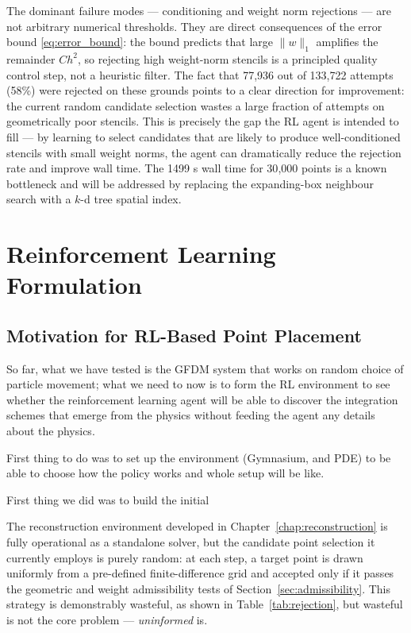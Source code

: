 \documentclass[12pt, a4paper, twoside]{report}
\theoremstyle{plain}
\theoremstyle{definition}
\begin{document}
The dominant failure modes --- conditioning and weight norm rejections
--- are not arbitrary numerical thresholds. They are direct consequences
of the error bound \eqref{eq:error_bound}: the bound predicts that
large $\|w\|_1$ amplifies the remainder $Ch^2$, so rejecting high
weight-norm stencils is a principled quality control step, not a
heuristic filter. The fact that 77{,}936 out of 133{,}722 attempts
(58\%) were rejected on these grounds points to a clear direction for
improvement: the current random candidate selection wastes a large
fraction of attempts on geometrically poor stencils. This is precisely
the gap the RL agent is intended to fill --- by learning to select
candidates that are likely to produce well-conditioned stencils with
small weight norms, the agent can dramatically reduce the rejection
rate and improve wall time. The 1499 s wall time for 30{,}000 points is a known bottleneck and will be addressed by replacing the
expanding-box neighbour search with a $k$-d tree spatial index.\chapter{Reinforcement Learning Formulation}

\section{Motivation for RL-Based Point Placement}


So far, what we have tested is the GFDM system that works on random choice of particle movement; what we need to now is to form the RL environment to see whether the reinforcement learning agent will be able to discover the integration schemes that emerge from the physics without feeding the agent any details about the physics. 

First thing to do was to set up the environment (Gymnasium, and PDE) to be able to choose how the policy works and whole setup will be like.

First thing we did was to build the initial


The reconstruction environment developed in Chapter~\ref{chap:reconstruction} is fully
operational as a standalone solver, but the candidate point selection it currently employs
is purely random: at each step, a target point is drawn uniformly from a pre-defined
finite-difference grid and accepted only if it passes the geometric and weight admissibility
tests of Section~\ref{sec:admissibility}. This strategy is demonstrably wasteful, as shown
in Table~\ref{tab:rejection}, but wasteful is not the core problem --- \emph{uninformed}
is.
\end{document}
